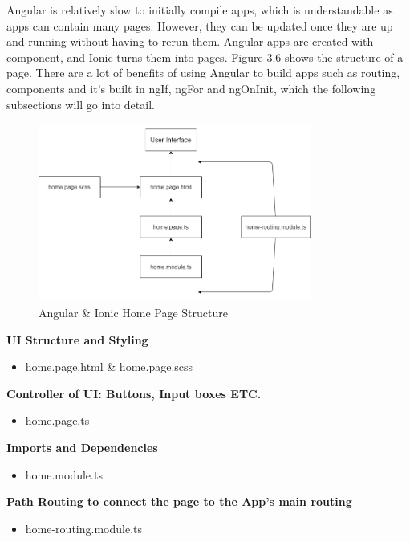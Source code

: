 Angular is relatively slow to initially compile apps, which is understandable as apps can contain many pages. However, they can be updated once they are up and running without having to rerun them. Angular apps are created with component, and Ionic turns them into pages. Figure 3.6 shows the structure of a page. There are a lot of benefits of using Angular to build apps such as routing, components and it's built in ngIf, ngFor and ngOnInit, which the following subsections will go into detail.

\begin{figure}[H]
    \caption{Angular \& Ionic Home Page Structure}
    \label{image:ngHomePage}
    \centering
    \includegraphics[width=0.8\textwidth]{images/misc/ng-homepage.png}
\end{figure}

\textbf{UI Structure and Styling}
\begin{itemize}
    \item home.page.html \& home.page.scss
\end{itemize} 

\textbf{Controller of UI: Buttons, Input boxes ETC.}
\begin{itemize}
    \item home.page.ts 
\end{itemize} 

\textbf{Imports and Dependencies}
\begin{itemize}
    \item home.module.ts
\end{itemize} 

\textbf{Path Routing to connect the page to the App's main routing}
\begin{itemize}
    \item home-routing.module.ts
\end{itemize} 

